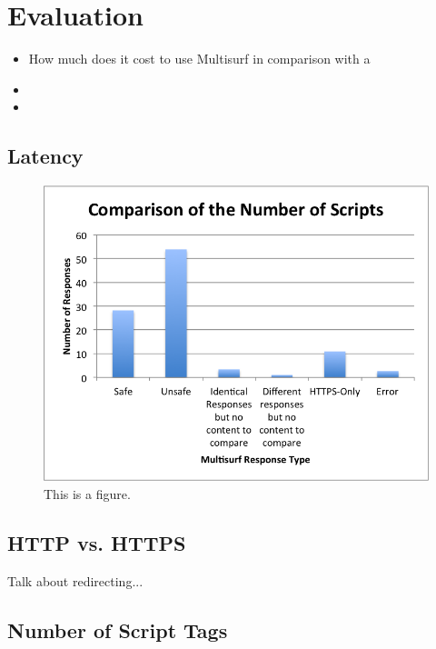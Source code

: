 \section{Evaluation}
\label{sec:eval}

\begin{itemize}
\item How much does it cost to use Multisurf in comparison with a 
\item
\item 
\end{itemize}

\subsection{Latency}

\begin{figure}[htb]
\begin{center}
\includegraphics[width=\linewidth]{scripts}
\caption{This is a figure.}
\end{center}
\end{figure}

\subsection{HTTP vs. HTTPS}
Talk about redirecting...

\subsection{Number of Script Tags}

